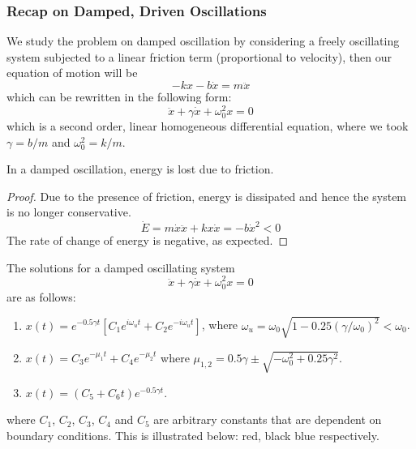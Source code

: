 \documentclass[a4paper]{article}
\begin{document}
\subsubsection*{Recap on Damped, Driven Oscillations}
\begin{defi}
We study the problem on damped oscillation by considering a freely oscillating system subjected to a linear friction term (proportional to velocity), then our equation of motion will be
$$-kx-b\dot{x}=m\ddot{x}$$
which can be rewritten in the following form:
$$\ddot{x}+\gamma\dot{x}+\omega_0^2x=0$$
which is a second order, linear homogeneous differential equation, where we took $\gamma=b/m$ and $\omega_0^2=k/m$.
\end{defi}
\begin{cor}
In a damped oscillation, energy is lost due to friction.
\end{cor}
\begin{proof}
Due to the presence of friction, energy is dissipated and hence the system is no longer conservative. 
$$\dot{E}=m\dot{x}\ddot{x}+kx\dot{x}=-b\dot{x}^2<0$$
The rate of change of energy is negative, as expected.
\end{proof}
\begin{thm}
The solutions for a damped oscillating system
$$\ddot{x}+\gamma\dot{x}+\omega_0^2x=0$$
are as follows:
\begin{enumerate}
    \item $x(t)=e^{-0.5\gamma t}[C_1e^{i\omega_ut}+C_2e^{-i\omega_ut}]$, where $\omega_u=\omega_0\sqrt{1-0.25(\gamma/\omega_0)^2}<\omega_0$.
    \item $x(t)=C_3e^{-\mu_1t}+C_4e^{-\mu_2t}$ where $\mu_{1,2}=0.5\gamma\pm\sqrt{-\omega_0^2+0.25\gamma^2}$.
    \item $x(t)=(C_5+C_6t)e^{-0.5\gamma t}$.
\end{enumerate}
where $C_1$, $C_2$, $C_3$, $C_4$ and $C_5$ are arbitrary constants that are dependent on boundary conditions. This is illustrated below: red, black blue respectively.
\begin{center}
\end{center}
\end{thm}
\end{document}
